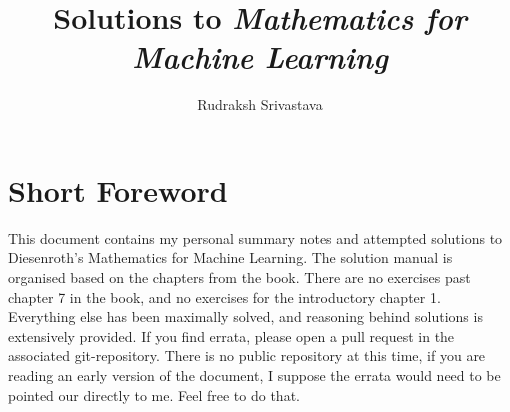 \documentclass[a4paper]{report}
\title{Solutions to \textit{Mathematics for Machine Learning}}
\author{Rudraksh Srivastava}
\date{}
\begin{document}
    \maketitle
    \thispagestyle{empty}
    
    \chapter*{Short Foreword}
    
    This document contains my personal summary notes and attempted solutions to Diesenroth's Mathematics for Machine Learning. The solution manual is organised based on the chapters from the book. There are no exercises past chapter 7 in the book, and no exercises for the introductory chapter 1. Everything else has been maximally solved, and reasoning behind solutions is extensively provided. If you find errata, please open a pull request in the associated git-repository. There is no public repository at this time, if you are reading an early version of the document, I suppose the errata would need to be pointed our directly to me. Feel free to do that.

    \pagebreak

    \tableofcontents
    
    
    
    
    
    
    
\end{document}
